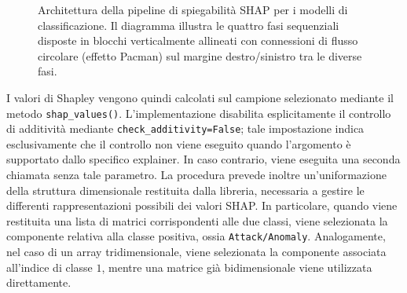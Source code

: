 \begin{figure}[H]
    \caption{Architettura della pipeline di spiegabilità SHAP per i modelli di classificazione. Il diagramma illustra le quattro fasi sequenziali disposte in blocchi verticalmente allineati con connessioni di flusso circolare (effetto Pacman) sul margine destro/sinistro tra le diverse fasi.}
    \label{fig:shap_pipeline_architecture}
\end{figure}

I valori di Shapley vengono quindi calcolati sul campione selezionato mediante il metodo \texttt{shap\_values()}. 
L'implementazione disabilita esplicitamente il controllo di additività mediante \texttt{check\_additivity=False}; tale impostazione indica esclusivamente che il controllo non viene eseguito quando l'argomento è supportato dallo specifico explainer. 
In caso contrario, viene eseguita una seconda chiamata senza tale parametro. La procedura prevede inoltre un'uniformazione della struttura dimensionale restituita dalla libreria, necessaria a gestire le differenti rappresentazioni possibili dei valori SHAP. 
In particolare, quando viene restituita una lista di matrici corrispondenti alle due classi, viene selezionata la componente relativa alla classe positiva, ossia \texttt{Attack/Anomaly}. 
Analogamente, nel caso di un array tridimensionale, viene selezionata la componente associata all'indice di classe $1$, mentre una matrice già bidimensionale viene utilizzata direttamente.

